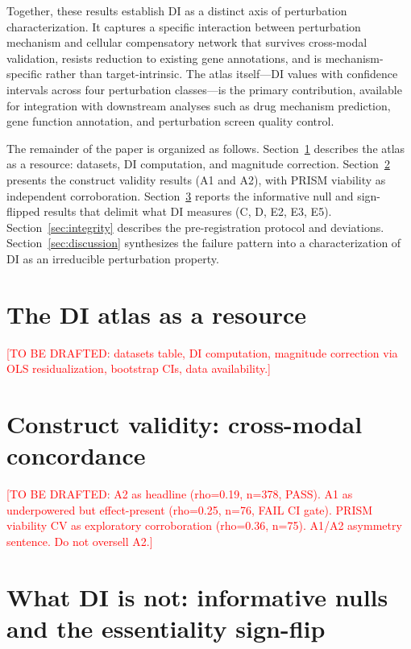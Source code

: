 \documentclass[11pt]{article}
\begin{document}
Together, these results establish DI as a distinct axis of perturbation
characterization.  It captures a specific interaction between
perturbation mechanism and cellular compensatory network that survives
cross-modal validation, resists reduction to existing gene annotations,
and is mechanism-specific rather than target-intrinsic.  The atlas
itself---DI values with confidence intervals across four perturbation
classes---is the primary contribution, available for integration with
downstream analyses such as drug mechanism prediction, gene function
annotation, and perturbation screen quality control.

The remainder of the paper is organized as follows.
Section~\ref{sec:atlas} describes the atlas as a resource: datasets,
DI computation, and magnitude correction.
Section~\ref{sec:concordance} presents the construct validity results
(A1 and A2), with PRISM viability as independent corroboration.
Section~\ref{sec:whatnot} reports the informative null and sign-flipped
results that delimit what DI measures (C, D, E2, E3, E5).
Section~\ref{sec:integrity} describes the pre-registration protocol and
deviations.
Section~\ref{sec:discussion} synthesizes the failure pattern into a
characterization of DI as an irreducible perturbation property.



\section{The DI atlas as a resource}
\label{sec:atlas}

\textcolor{red}{[TO BE DRAFTED: datasets table, DI computation, magnitude correction via OLS residualization, bootstrap CIs, data availability.]}

\section{Construct validity: cross-modal concordance}
\label{sec:concordance}

\textcolor{red}{[TO BE DRAFTED: A2 as headline (rho=0.19, n=378, PASS). A1 as underpowered but effect-present (rho=0.25, n=76, FAIL CI gate). PRISM viability CV as exploratory corroboration (rho=0.36, n=75). A1/A2 asymmetry sentence. Do not oversell A2.]}

\section{What DI is not: informative nulls and the essentiality sign-flip}
\label{sec:whatnot}
\end{document}

